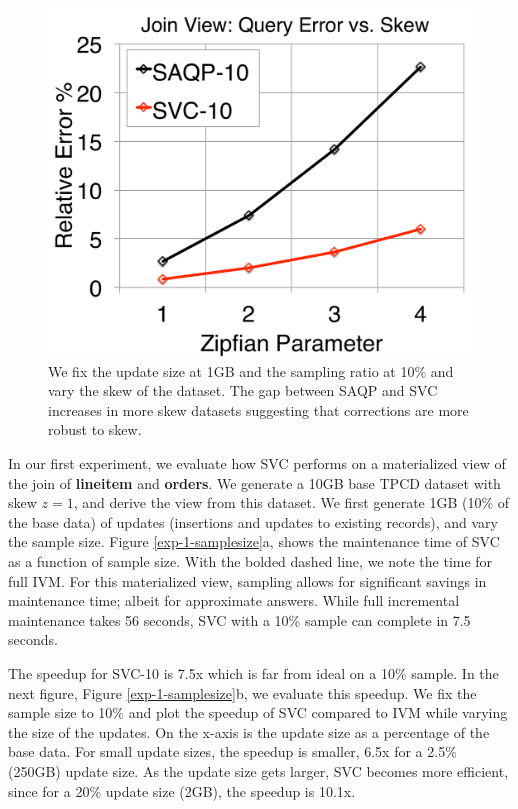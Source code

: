 \begin{figure}[t]
\centering
  \includegraphics[scale=0.25]{exp/msj_5.pdf}
 \caption{We fix the update size at 1GB and the sampling ratio at 10\% and vary the skew of the dataset. The gap between SAQP and SVC increases in more skew datasets suggesting that corrections are more robust to skew. \label{exp-1-zipf}}
\end{figure}

In our first experiment, we evaluate how SVC performs on a materialized view of the join of \textbf{lineitem} and \textbf{orders}.
We generate a 10GB base TPCD dataset with skew $z=1$, and derive the view from this dataset.
We first generate 1GB (10\% of the base data) of updates (insertions and updates to existing records), and vary the sample size.
Figure \ref{exp-1-samplesize}a, shows the maintenance time of SVC as a function of sample size.
With the bolded dashed line, we note the time for full IVM. 
For this materialized view, sampling allows for significant savings in maintenance time; albeit for approximate answers.
While full incremental maintenance takes 56 seconds, SVC with a 10\% sample can complete in 7.5 seconds.

The speedup for SVC-10 is 7.5x which is far from ideal on a 10\% sample.
In the next figure, Figure \ref{exp-1-samplesize}b, we evaluate this speedup. 
We fix the sample size to 10\% and plot the speedup of SVC compared to IVM while varying the size of the updates.
On the x-axis is the update size as a percentage of the base data.
For small update sizes, the speedup is smaller, 6.5x for a 2.5\% (250GB) update size.
As the update size gets larger, SVC becomes more efficient, since for a 20\% update size (2GB), the speedup is 10.1x. 

